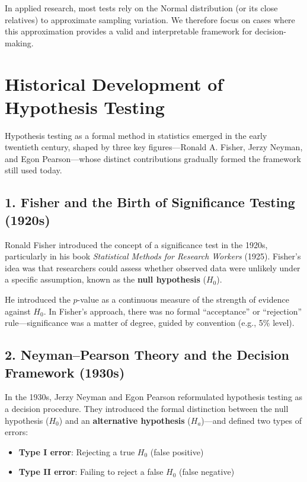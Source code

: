 \documentclass[
  letterpaper,
  DIV=11,
  numbers=noendperiod]{scrreprt}
\providecommand{\tightlist}{%
  \setlength{\itemsep}{0pt}\setlength{\parskip}{0pt}}
\begin{document}
In applied research, most tests rely on the Normal distribution (or its
close relatives) to approximate sampling variation. We therefore focus
on cases where this approximation provides a valid and interpretable
framework for decision-making.

\section{Historical Development of Hypothesis
Testing}\label{historical-development-of-hypothesis-testing}

Hypothesis testing as a formal method in statistics emerged in the early
twentieth century, shaped by three key figures---Ronald A. Fisher, Jerzy
Neyman, and Egon Pearson---whose distinct contributions gradually formed
the framework still used today.

\subsection{1. Fisher and the Birth of Significance Testing
(1920s)}\label{fisher-and-the-birth-of-significance-testing-1920s}

Ronald Fisher introduced the concept of a significance test in the
1920s, particularly in his book \emph{Statistical Methods for Research
Workers} (1925). Fisher's idea was that researchers could assess whether
observed data were unlikely under a specific assumption, known as the
\textbf{null hypothesis} (\(H_0\)).

He introduced the \(p\)-value as a continuous measure of the strength of
evidence against \(H_0\). In Fisher's approach, there was no formal
``acceptance'' or ``rejection'' rule---significance was a matter of
degree, guided by convention (e.g., 5\% level).

\subsection{2. Neyman--Pearson Theory and the Decision Framework
(1930s)}\label{neymanpearson-theory-and-the-decision-framework-1930s}

In the 1930s, Jerzy Neyman and Egon Pearson reformulated hypothesis
testing as a decision procedure. They introduced the formal distinction
between the null hypothesis (\(H_0\)) and an \textbf{alternative
hypothesis} (\(H_a\))---and defined two types of errors:

\begin{itemize}
\tightlist
\item
  \textbf{Type I error}: Rejecting a true \(H_0\) (false positive)
\item
  \textbf{Type II error}: Failing to reject a false \(H_0\) (false
  negative)
\end{itemize}
\end{document}
